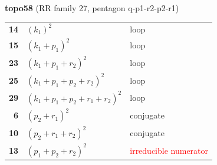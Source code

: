 \documentclass[10pt]{article}
\begin{document}
\begin{minipage}[t]{0.48\textwidth}
{}\\[2mm]\textbf{topo58} (RR family 27, pentagon q-p1-r2-p2-r1)\\[2pt]{\footnotesize\begin{tabular}{@{}r@{\ \ }l@{\ \ }l@{}}\textbf{14} & $(k_1)^2$ & loop\\
\textbf{15} & $(k_1+p_1)^2$ & loop\\
\textbf{23} & $(k_1+p_1+r_2)^2$ & loop\\
\textbf{25} & $(k_1+p_1+p_2+r_2)^2$ & loop\\
\textbf{29} & $(k_1+p_1+p_2+r_1+r_2)^2$ & loop\\
\textbf{6} & $(p_2+r_1)^2$ & conjugate\\
\textbf{10} & $(p_2+r_1+r_2)^2$ & conjugate\\
\textbf{13} & $(p_1+p_2+r_2)^2$ & \textcolor{red}{irreducible numerator}\\\end{tabular}}\end{minipage}

\bigskip
\end{document}
